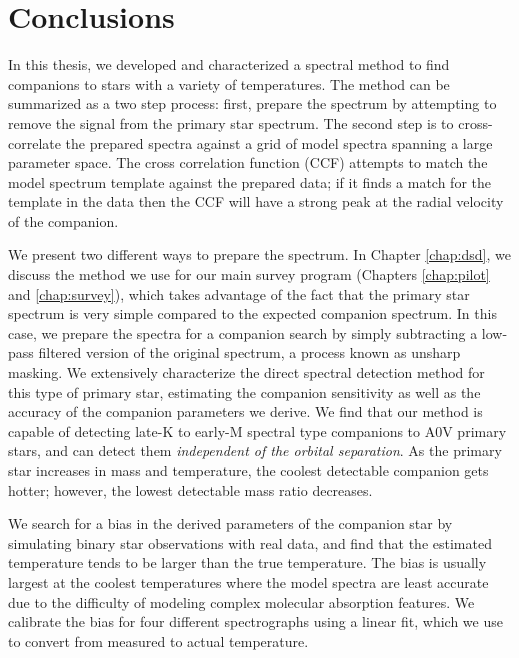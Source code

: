 \documentclass{utthesis}
\begin{document}



\chapter{Conclusions}

In this thesis, we developed and characterized a spectral method to find companions to stars with a variety of temperatures. The method can be summarized as a two step process: first, prepare the spectrum by attempting to remove the signal from the primary star spectrum. The second step is to cross-correlate the prepared spectra against a grid of model spectra spanning a large parameter space. The cross correlation function (CCF) attempts to match the model spectrum template against the prepared data; if it finds a match for the template in the data then the CCF will have a strong peak at the radial velocity of the companion.

We present two different ways to prepare the spectrum. In Chapter \ref{chap:dsd}, we discuss the method we use for our main survey program (Chapters \ref{chap:pilot} and \ref{chap:survey}), which takes advantage of the fact that the primary star spectrum is very simple compared to the expected companion spectrum. In this case, we prepare the spectra for a companion search by simply subtracting a low-pass filtered version of the original spectrum, a process known as unsharp masking. We extensively characterize the direct spectral detection method for this type of primary star, estimating the companion sensitivity as well as the accuracy of the companion parameters we derive. We find that our method is capable of detecting late-K to early-M spectral type companions to A0V primary stars, and can detect them \emph{independent of the orbital separation}. As the primary star increases in mass and temperature, the coolest detectable companion gets hotter; however, the lowest detectable mass ratio decreases. 

We search for a bias in the derived parameters of the companion star by simulating binary star observations with real data, and find that the estimated temperature tends to be larger than the true temperature. The bias is usually largest at the coolest temperatures where the model spectra are least accurate due to the difficulty of modeling complex molecular absorption features. We calibrate the bias for four different spectrographs using a linear fit, which we use to convert from measured to actual temperature.
\end{document}
